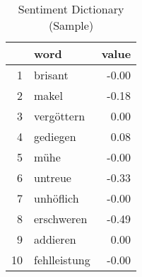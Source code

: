 \begin{table}[ht]
\centering
\begin{tabular}{rlr}
  \hline
 & word & value \\ 
  \hline
1 & brisant & -0.00 \\ 
  2 & makel & -0.18 \\ 
  3 & vergöttern & 0.00 \\ 
  4 & gediegen & 0.08 \\ 
  5 & mühe & -0.00 \\ 
  6 & untreue & -0.33 \\ 
  7 & unhöflich & -0.00 \\ 
  8 & erschweren & -0.49 \\ 
  9 & addieren & 0.00 \\ 
  10 & fehlleistung & -0.00 \\ 
   \hline
\end{tabular}
\caption{Sentiment Dictionary (Sample)} 
\label{t_sentdict}
\end{table}
